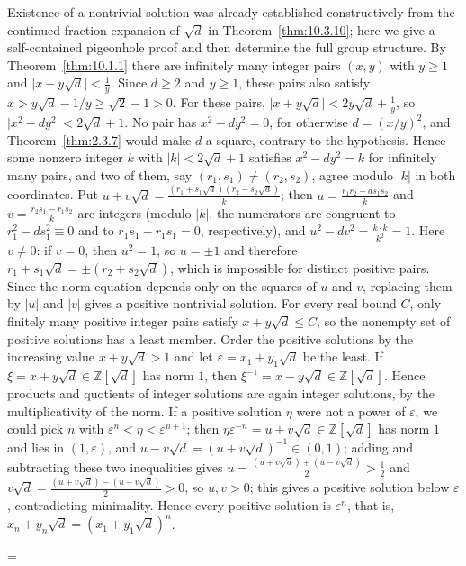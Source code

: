 \documentclass[11pt]{article}
\makeatletter
\theoremstyle{ntstyle}
\let\nt@closedisplay\]
\def\nt@guardedclose{\@ifnextchar\par{\nt@closeafterpar}{\@ifnextchar\end{\postdisplaypenalty\@M\nt@closedisplay}{\nt@closedisplay}}}
\def\nt@closeafterpar\par{\@ifnextchar\par{\nt@closeafterpar}{\@ifnextchar\end{\postdisplaypenalty\@M\nt@closedisplay\par}{\nt@closedisplay\par}}}
\renewenvironment{proof}[1][\proofname]{\par
  \pushQED{\qed}\normalfont\topsep\medskipamount\edef\nt@afterproof{\@endparpenalty=\the\@endparpenalty\relax}\@beginparpenalty\@M\@endparpenalty\@M\let\]\nt@guardedclose\trivlist\item[]\textit{#1\@addpunct{.}} \ignorespaces}{\ifvmode\addpenalty\@M\fi\popQED\nt@afterproof\endtrivlist\@endpefalse}
\makeatother
\begin{document}
\begin{proof} Existence of a nontrivial solution was
	already established constructively from the continued fraction expansion
	of $\sqrt{d}$ in Theorem~\ref{thm:10.3.10}; here we give a self-contained
	pigeonhole proof and then determine the full group structure. By
	Theorem~\ref{thm:10.1.1} there are infinitely many integer pairs $(x,y)$
	with $y\ge1$ and $\big|x-y\sqrt{d}\big|<\tfrac{1}{y}$. Since $d\ge2$ and
	$y\ge1$, these pairs also satisfy
	$x>y\sqrt d-1/y\ge\sqrt2-1>0$. For these pairs,
	$\big|x+y\sqrt{d}\big|<2y\sqrt{d}+\tfrac{1}{y}$, so
	$\big|x^2-dy^2\big|<2\sqrt{d}+1$. No pair has
	$x^2-dy^2=0$, for otherwise $d=(x/y)^2$, and Theorem~\ref{thm:2.3.7}
	would make $d$ a square, contrary to the hypothesis. Hence some nonzero integer $k$ with
	$|k|<2\sqrt{d}+1$ satisfies $x^2-dy^2=k$ for infinitely many pairs,
	and two of them, say $(r_1,s_1)\neq(r_2,s_2)$, agree modulo $|k|$ in both
	coordinates. Put $u+v\sqrt{d}=\tfrac{(r_1+s_1\sqrt{d})(r_2-s_2\sqrt
			{d})}{k}$; then $u=\tfrac{r_1r_2-ds_1s_2}{k}$ and
	$v=\tfrac{r_2s_1-r_1s_2}{k}$ are integers (modulo $|k|$, the numerators are congruent to
		$r_1^2-ds_1^2\equiv0$ and to $r_1s_1-r_1s_1=0$, respectively), and
	$u^2-dv^2=\tfrac{k\cdot k}{k^2}=1$. Here $v\neq0$: if $v=0$, then
	$u^2=1$, so $u=\pm1$ and therefore
	$r_1+s_1\sqrt{d}=\pm(r_2+s_2\sqrt{d})$, which is impossible for distinct
	positive pairs. Since the norm equation depends only on the squares of
	$u$ and $v$, replacing them by $|u|$ and $|v|$ gives a positive
	nontrivial solution. For every real bound $C$, only finitely many
	positive integer pairs satisfy $x+y\sqrt d\le C$, so the nonempty set
	of positive solutions has a least member. Order the positive solutions
	by the increasing value $x+y\sqrt{d}>1$ and let
	$\varepsilon=x_1+y_1\sqrt{d}$ be the least. If
	$\xi=x+y\sqrt{d}\in\mathbb{Z}[\sqrt{d}]$ has norm $1$, then
	$\xi^{-1}=x-y\sqrt{d}\in\mathbb{Z}[\sqrt{d}]$. Hence products and
	quotients of integer solutions are again integer solutions, by the
	multiplicativity of the norm. If a positive solution $\eta$ were
	not a power of $\varepsilon$, we could pick $n$ with
	$\varepsilon^n<\eta<\varepsilon^{n+1}$; then
	$\eta\varepsilon^{-n}=u+v\sqrt{d}\in\mathbb{Z}[\sqrt{d}]$ has norm $1$ and lies in
	$(1,\varepsilon)$, and $u-v\sqrt{d}=(u+v\sqrt{d})^{-1}\in(0,1)$; adding and subtracting
	these two inequalities gives $u=\tfrac{(u+v\sqrt{d})+(u-v\sqrt
			{d})}{2}>\tfrac12$ and $v\sqrt{d}=\tfrac{(u+v\sqrt{d})-(u-v\sqrt
			{d})}{2}>0$, so $u,v>0$; this gives a positive solution below $\varepsilon$, contradicting
	minimality. Hence every positive solution is $\varepsilon^n$, that is,
	$x_n+y_n\sqrt{d}=(x_1+y_1\sqrt{d})^n$.


\end{proof}
\end{document}
